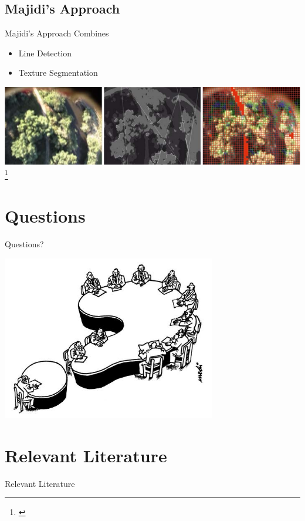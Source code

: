\documentclass{beamer}
\begin{document}
\subsection{Majidi's Approach}
\begin{frame}{Majidi's Approach}
Combines
\begin{itemize}
\item Line Detection
\item Texture Segmentation
\end{itemize}
\includegraphics[width = \textwidth]{majidi.png}\footnote{\cite{Majidi2009}}
\end{frame}

\section{Questions}
\begin{frame}{Questions?}
\begin{center}
\includegraphics[width = 0.7\textwidth]{questions.jpg}
\end{center}
\end{frame}

\section{Relevant Literature}
\begin{frame}[allowframebreaks]{Relevant Literature}
\footnotesize
\nocite{*}


\end{frame}
\end{document}
